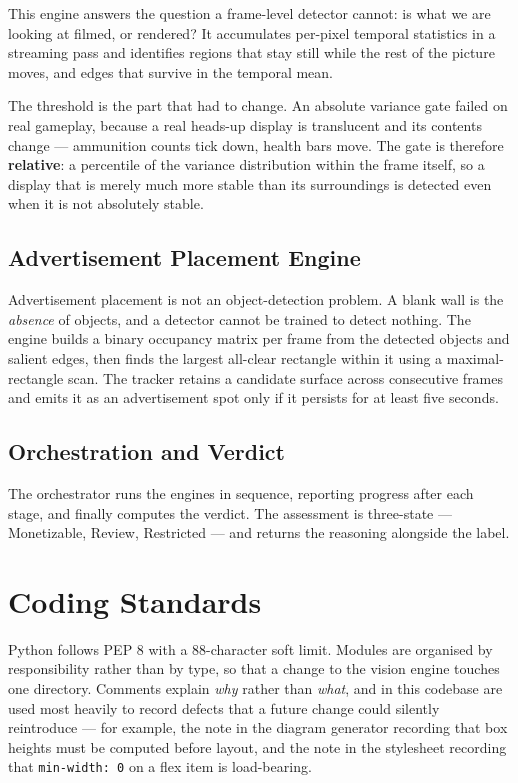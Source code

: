 \documentclass[
12pt,
a4paper,
oneside
]{report}
\begin{document}
This engine answers the question a frame-level detector cannot: is what we are
looking at filmed, or rendered? It accumulates per-pixel temporal statistics in
a streaming pass and identifies regions that stay still while the rest of the
picture moves, and edges that survive in the temporal mean.

The threshold is the part that had to change. An absolute variance gate failed
on real gameplay, because a real heads-up display is translucent and its
contents change --- ammunition counts tick down, health bars move. The gate is
therefore \textbf{relative}: a percentile of the variance distribution within
the frame itself, so a display that is merely much more stable than its
surroundings is detected even when it is not absolutely stable.

\subsection{Advertisement Placement Engine}

Advertisement placement is not an object-detection problem. A blank wall is the
\emph{absence} of objects, and a detector cannot be trained to detect nothing.
The engine builds a binary occupancy matrix per frame from the detected objects
and salient edges, then finds the largest all-clear rectangle within it using a
maximal-rectangle scan. The tracker retains a candidate surface across
consecutive frames and emits it as an advertisement spot only if it persists for
at least five seconds.

\subsection{Orchestration and Verdict}

The orchestrator runs the engines in sequence, reporting progress after each
stage, and finally computes the verdict. The assessment is three-state ---
Monetizable, Review, Restricted --- and returns the reasoning alongside the
label.

\section{Coding Standards}

Python follows PEP 8 with a 88-character soft limit. Modules are organised by
responsibility rather than by type, so that a change to the vision engine
touches one directory. Comments explain \emph{why} rather than \emph{what}, and
in this codebase are used most heavily to record defects that a future change
could silently reintroduce --- for example, the note in the diagram generator
recording that box heights must be computed before layout, and the note in the
stylesheet recording that \texttt{min-width: 0} on a flex item is load-bearing.
\end{document}
